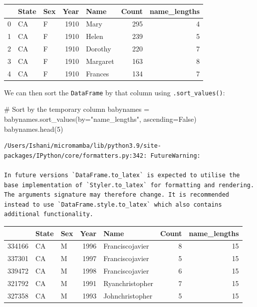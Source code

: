 \documentclass[
  letterpaper,
  DIV=11,
  numbers=noendperiod]{scrreprt}
\newenvironment{Shaded}{\begin{snugshade}}{\end{snugshade}}
\newcommand{\CommentTok}[1]{\textcolor[rgb]{0.37,0.37,0.37}{#1}}
\newcommand{\DecValTok}[1]{\textcolor[rgb]{0.68,0.00,0.00}{#1}}
\newcommand{\NormalTok}[1]{\textcolor[rgb]{0.00,0.23,0.31}{#1}}
\newcommand{\OperatorTok}[1]{\textcolor[rgb]{0.37,0.37,0.37}{#1}}
\newcommand{\StringTok}[1]{\textcolor[rgb]{0.13,0.47,0.30}{#1}}
\newcommand{\VariableTok}[1]{\textcolor[rgb]{0.07,0.07,0.07}{#1}}
\begin{document}
\begin{tabular}{lllrlrr}
\toprule
{} & State & Sex &  Year &      Name &  Count &  name\_lengths \\
\midrule
0 &    CA &   F &  1910 &      Mary &    295 &             4 \\
1 &    CA &   F &  1910 &     Helen &    239 &             5 \\
2 &    CA &   F &  1910 &   Dorothy &    220 &             7 \\
3 &    CA &   F &  1910 &  Margaret &    163 &             8 \\
4 &    CA &   F &  1910 &   Frances &    134 &             7 \\
\bottomrule
\end{tabular}

We can then sort the \texttt{DataFrame} by that column using
\texttt{.sort\_values()}:

\begin{Shaded}
\begin{Highlighting}[]
\CommentTok{\# Sort by the temporary column}
\NormalTok{babynames }\OperatorTok{=}\NormalTok{ babynames.sort\_values(by}\OperatorTok{=}\StringTok{"name\_lengths"}\NormalTok{, ascending}\OperatorTok{=}\VariableTok{False}\NormalTok{)}
\NormalTok{babynames.head(}\DecValTok{5}\NormalTok{)}
\end{Highlighting}
\end{Shaded}

\begin{verbatim}
/Users/Ishani/micromamba/lib/python3.9/site-packages/IPython/core/formatters.py:342: FutureWarning:

In future versions `DataFrame.to_latex` is expected to utilise the base implementation of `Styler.to_latex` for formatting and rendering. The arguments signature may therefore change. It is recommended instead to use `DataFrame.style.to_latex` which also contains additional functionality.
\end{verbatim}

\begin{tabular}{lllrlrr}
\toprule
{} & State & Sex &  Year &             Name &  Count &  name\_lengths \\
\midrule
334166 &    CA &   M &  1996 &  Franciscojavier &      8 &            15 \\
337301 &    CA &   M &  1997 &  Franciscojavier &      5 &            15 \\
339472 &    CA &   M &  1998 &  Franciscojavier &      6 &            15 \\
321792 &    CA &   M &  1991 &  Ryanchristopher &      7 &            15 \\
327358 &    CA &   M &  1993 &  Johnchristopher &      5 &            15 \\
\bottomrule
\end{tabular}
\end{document}
